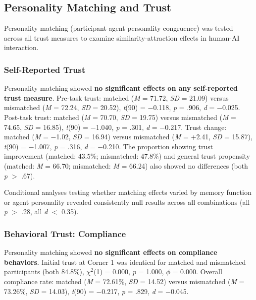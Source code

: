 \documentclass[12pt]{article}
\begin{document}
\subsection{Personality Matching and Trust}

Personality matching (participant-agent personality congruence) was tested across all trust measures to examine similarity-attraction effects in human-AI interaction.

\subsubsection{Self-Reported Trust}

Personality matching showed \textbf{no significant effects on any self-reported trust measure}. Pre-task trust: matched (\textit{M} = 71.72, \textit{SD} = 21.09) versus mismatched (\textit{M} = 72.24, \textit{SD} = 20.52), \textit{t}(90) = $-$0.118, \textit{p} = .906, \textit{d} = $-$0.025. Post-task trust: matched (\textit{M} = 70.70, \textit{SD} = 19.75) versus mismatched (\textit{M} = 74.65, \textit{SD} = 16.85), \textit{t}(90) = $-$1.040, \textit{p} = .301, \textit{d} = $-$0.217. Trust change: matched (\textit{M} = $-$1.02, \textit{SD} = 16.94) versus mismatched (\textit{M} = +2.41, \textit{SD} = 15.87), \textit{t}(90) = $-$1.007, \textit{p} = .316, \textit{d} = $-$0.210. The proportion showing trust improvement (matched: 43.5\%; mismatched: 47.8\%) and general trust propensity (matched: \textit{M} = 66.70; mismatched: \textit{M} = 66.24) also showed no differences (both \textit{p} $>$ .67).

Conditional analyses testing whether matching effects varied by memory function or agent personality revealed consistently null results across all combinations (all \textit{p} $>$ .28, all \textit{d} $<$ 0.35).

\subsubsection{Behavioral Trust: Compliance}

Personality matching showed \textbf{no significant effects on compliance behaviors}. Initial trust at Corner 1 was identical for matched and mismatched participants (both 84.8\%), $\chi^2$(1) = 0.000, \textit{p} = 1.000, $\phi$ = 0.000. Overall compliance rate: matched (\textit{M} = 72.61\%, \textit{SD} = 14.52) versus mismatched (\textit{M} = 73.26\%, \textit{SD} = 14.03), \textit{t}(90) = $-$0.217, \textit{p} = .829, \textit{d} = $-$0.045.
\end{document}
